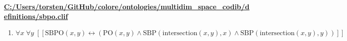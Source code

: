 \documentclass{article}
\begin{document}
\textbf{\url{C:/Users/torsten/GitHub/colore/ontologies/multidim\_space\_codib/definitions/sbpo.clif}}

\begin{enumerate}
\item $\forall x\; \forall y\;  \left[ \left[ \textrm{SBPO}(x,y) \leftrightarrow \left(\textrm{PO}(x,y) \land \textrm{SBP}(\textrm{intersection}(x,y),x) \land \textrm{SBP}(\textrm{intersection}(x,y),y)\right) \right] \right]$
\end{enumerate}
\end{document}

